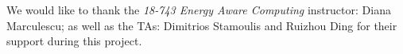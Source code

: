 We would like to thank the \textsl{18-743 Energy Aware Computing} instructor: Diana Marculescu; as well as the TAs: Dimitrios Stamoulis and Ruizhou Ding for their support during this project. 